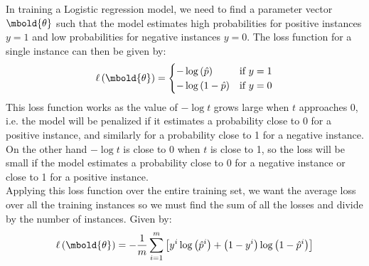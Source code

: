 \documentclass[12pt letter]{report}
\begin{document}
In training a Logistic regression model, we need to find a parameter vector $\mbold{\theta}$ such that the model
estimates high probabilities for positive instances $y = 1$ and low probabilities for negative instances $y = 0$. The
loss function for a single instance can then be given by:
\[
  \ell \left( \mbold{\theta} \right)  = \begin{cases}
    - \log \left( \hat{p} \right)     & \text{if } y = 1 \\
    - \log \left( 1 - \hat{p} \right) & \text{if } y = 0
  \end{cases}
\]
This loss function works as the value of $-\log t$ grows large when $t$ approaches 0, i.e. the model will be penalized
if it estimates a probability close to 0 for a positive instance, and similarly for a probability close to 1 for a
negative instance. On the other hand $- \log t$ is close to 0 when $t$ is close to 1, so the loss will be small if the
model estimates a probability close to 0 for a negative instance or close to 1 for a positive instance. \\

Applying this loss function over the entire training set, we want the average loss over all the training instances so we
must find the sum of all the losses and divide by the number of instances. Given by:
\[
  \ell \left( \mbold{\theta} \right)  = -\frac{1}{m} \displaystyle\sum_{i=1}^{m} \left[ y^{i} \log \left( \hat{p}^{i}
    \right) + \left( 1 - y^{i} \right) \log \left( 1 - \hat{p}^{i} \right)    \right]
\]
\end{document}
